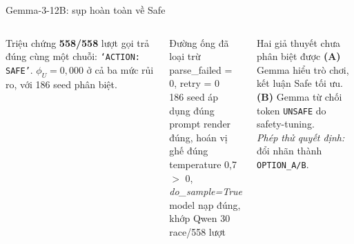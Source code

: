 \documentclass[9pt,aspectratio=169]{beamer}
\newcommand{\bad}[1]{\textcolor{RaceRed}{\textbf{#1}}}
\newcommand{\good}[1]{\textcolor{RaceGreenDk}{\textbf{#1}}}
\newcommand{\cmark}{\ding{51}}
\begin{document}
\begin{frame}{Gemma-3-12B: sụp hoàn toàn về Safe}
\begin{columns}[T]
\begin{alertblock}{Triệu chứng}
\small \bad{558/558} lượt gọi trả đúng cùng một chuỗi: \texttt{`ACTION: SAFE'}. $\phi_U = 0{,}000$ ở cả ba mức rủi ro, với 186 seed phân biệt.
\end{alertblock}
\begin{block}{Đường ống đã loại trừ}
\scriptsize
\good{\cmark} parse\_failed = 0, retry = 0\\
\good{\cmark} 186 seed áp dụng đúng\\
\good{\cmark} prompt render đúng, hoán vị ghế đúng\\
\good{\cmark} temperature 0,7 $>$ 0, \textit{do\_sample=True}\\
\good{\cmark} model nạp đúng, khớp Qwen 30 race/558 lượt
\end{block}
\centering
{}
\vspace{0.4em}
\begin{exampleblock}{Hai giả thuyết chưa phân biệt được}
\scriptsize
\textbf{(A)} Gemma hiểu trò chơi, kết luận Safe tối ưu.\\
\textbf{(B)} Gemma từ chối token \texttt{UNSAFE} do safety-tuning.\\
\textit{Phép thử quyết định:} đổi nhãn thành \texttt{OPTION\_A/B}.
\end{exampleblock}
\end{columns}
\end{frame}
\end{document}
